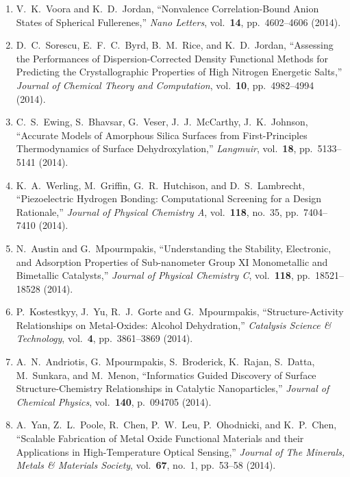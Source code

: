 \begin{enumerate}
\item V.\ K.\ Voora and K.\ D.\ Jordan, ``Nonvalence Correlation-Bound Anion States of Spherical Fullerenes,'' \textit{Nano Letters}, vol.\ \textbf{14}, pp.\ 4602--4606 (2014).

\item D.\ C.\ Sorescu, E.\ F.\ C.\ Byrd, B.\ M.\ Rice, and K.\ D.\ Jordan, ``Assessing the Performances of Dispersion-Corrected Density Functional   Methods for Predicting the Crystallographic Properties of High Nitrogen   Energetic Salts,'' \textit{Journal of Chemical Theory and Computation}, vol.\ \textbf{10}, pp.\ 4982--4994 (2014).

\item C.\ S.\ Ewing, S.\ Bhavsar, G.\ Veser, J.\ J.\ McCarthy, J.\ K.\ Johnson, ``Accurate Models of Amorphous Silica Surfaces from First-Principles Thermodynamics of Surface Dehydroxylation,'' \textit{Langmuir}, vol.\ \textbf{18}, pp.\ 5133--5141 (2014).

\item K.\ A.\ Werling, M.\ Griffin, G.\ R.\ Hutchison, and D.\ S.\ Lambrecht, ``Piezoelectric Hydrogen Bonding: Computational Screening for a Design Rationale,'' \textit{Journal of Physical Chemistry A}, vol.\ \textbf{118}, no.\ 35, pp.\ 7404--7410 (2014).

\item N.\ Austin and G.\ Mpourmpakis, ``Understanding the Stability,   Electronic, and Adsorption Properties of Sub-nanometer Group XI Monometallic and Bimetallic Catalysts,'' \textit{Journal of Physical Chemistry C}, vol.\ \textbf{118}, pp.\ 18521--18528 (2014).

\item P.\ Kostestkyy, J.\ Yu, R.\ J.\ Gorte and G.\ Mpourmpakis, ``Structure-Activity Relationships on Metal-Oxides: Alcohol Dehydration,'' \textit{Catalysis Science \& Technology}, vol.\ \textbf{4}, pp.\ 3861--3869 (2014).

\item A.\ N.\ Andriotis, G.\ Mpourmpakis, S.\ Broderick, K.\ Rajan, S.\ Datta, M.\ Sunkara, and M.\ Menon, ``Informatics Guided Discovery of Surface Structure-Chemistry Relationships in Catalytic Nanoparticles,'' \textit{Journal of Chemical Physics}, vol.\ \textbf{140}, p.\ 094705 (2014).

\item A.\ Yan, Z.\ L.\ Poole, R.\ Chen, P.\ W.\ Leu, P.\ Ohodnicki, and K.\ P.\ Chen, ``Scalable Fabrication of Metal Oxide Functional Materials and their Applications in High-Temperature Optical Sensing,'' \textit{Journal of The Minerals, Metals \& Materials Society}, vol.\ \textbf{67}, no.\ 1, pp.\ 53--58 (2014).


\end{enumerate}
